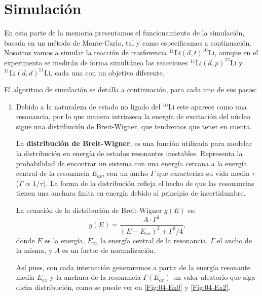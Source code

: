 \section{Simulación }

En esta parte de la memoria presentamos el funcionamiento de la simulación, basada en un método de Monte-Carlo, tal y como especificamos a continuación. Nosotros vamos a simular la reacción de trasferencia $^{11}\text{Li}(d,t)^{10}\text{Li}$, aunque en el experimento se medirán de forma simultánea las reacciones $^{11}\text{Li}(d,p)^{12}\text{Li}$ y  $^{11}\text{Li}(d,d)^{11}\text{Li}$, cada una con un objetivo diferente. 

El algoritmo de simulación se detalla a continuación, para cada uno de sus pasos:
\begin{enumerate}

    \item  Debido a la naturaleza de estado no ligado del $^{10}$Li este aparece como una resonancia, por lo que manera intrínseca la energía de excitación del núcleo sigue una distribución de Breit-Wigner, que tendremos que tener en cuenta.
    
    La \textbf{distribución de Breit-Wigner}, es una función utilizada para modelar la distribución en energía de estados resonantes inestables. Representa la probabilidad de encontrar un sistema con una energía cercana a la energía central de la resonancia $E_{ex}$, con un ancho $\Gamma$ que caracteriza su vida media $\tau$ ($\Gamma \propto 1/\tau$). La forma de la distribución refleja el hecho de que las resonancias tienen una anchura finita en energía debido al principio de incertidumbre.
    
    La ecuación de la distribución de Breit-Wigner $g(E)$ es:
    \begin{equation}
        g(E) = \frac{A \cdot  \Gamma^2}{(E - E_{ex})^2 + \Gamma^2/4},
    \end{equation}
    donde $E$ es la energía, $E_{ex}$ la energía central de la resonancia, $\Gamma$ el ancho de la misma, y $A$ es un factor de normalización.
     
    Así pues, con cada interacción generaremos a partir de la energía resonante media $E_{ex}$ y la anchura de la resonancia $\Gamma(E_{ex})$ un valor aleatorio que siga dicha distribución, como se puede ver en \cref{Fig:04-Ex0} y \cref{Fig:04-Ex2}.
    

\end{enumerate}
